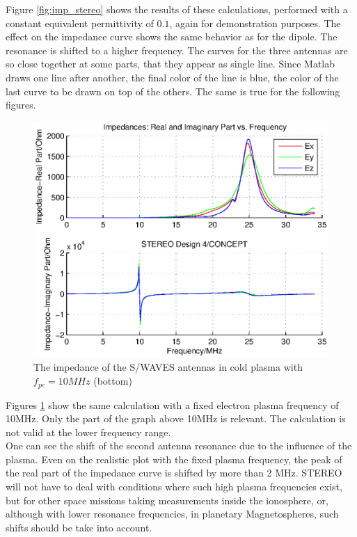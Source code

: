 \documentclass[a4paper,11pt]{article}
\begin{document}
Figure \ref{fig:imp_stereo} shows the results of these calculations, performed with a constant equivalent permittivity of $0.1$, again for demonstration purposes. The effect on the impedance curve shows the same behavior as for the dipole. The resonance is shifted to a higher frequency. The curves for the three antennas are so close together at some parts, that they appear as single line. Since Matlab draws one line after another, the final color of the line is blue, the color of the last curve to be drawn on top of the others. The same is true for the following figures.\\

\begin{figure}
\begin{center}
\includegraphics[width=11.5cm]{impedance_stereo_pl_fix.eps}
  \caption{The impedance of the S/WAVES antennas in cold plasma with $f_{pe}=10MHz$ (bottom)}\label{fig:imp_stereo_fix}
  \end{center}
\end{figure}

Figures \ref{fig:imp_stereo_fix} show the same calculation with a fixed electron plasma frequency of 10MHz. Only the part of the graph above 10MHz is relevant. The calculation is not valid at the lower frequency range.\\

One can see the shift of the second antenna resonance due to the influence of the plasma. Even on the realistic plot with the fixed plasma frequency, the peak of the real part of the impedance curve is shifted by more than 2 MHz. STEREO will not have to deal with conditions where such high plasma frequencies exist, but for other space missions taking measurements inside the ionosphere, or, although with lower resonance frequencies, in planetary Magnetospheres, such shifts should be take into account.\\
\end{document}
